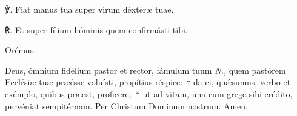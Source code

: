 ℣.  Fiat manus tua super virum déxteræ tuae.

℟. Et super fílium hóminis quem confirmásti tibi.

Orémus.

Deus, ómnium fidélium pastor et re\-ctor, fámulum tuum \textit{N.,} quem pastórem Ecclésiæ tuæ præésse voluísti, propítius réspice:~† da ei, quǽsumus, verbo et exémplo, quibus præest, proficere;~* ut ad vitam, una cum grege sibi crédito, pervéniat sempitérnam. Per Christum Dominum nostrum. Amen.